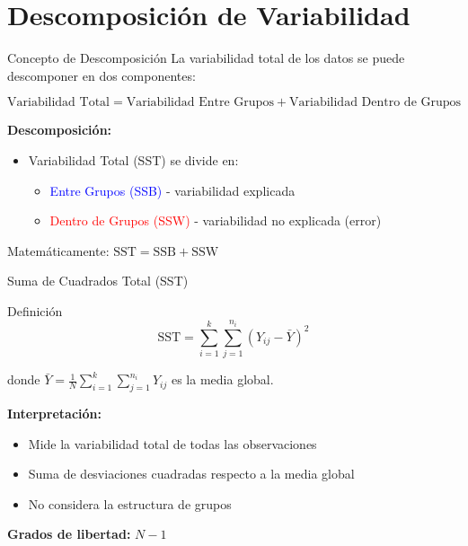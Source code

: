 \documentclass[10pt,aspectratio=169]{beamer}
\begin{document}
\section{Descomposición de Variabilidad}

\begin{frame}{Concepto de Descomposición}
La variabilidad total de los datos se puede descomponer en dos componentes:

\vspace{0.5cm}

\begin{equation*}
\text{Variabilidad Total} = \text{Variabilidad Entre Grupos} + \text{Variabilidad Dentro de Grupos}
\end{equation*}

\vspace{0.5cm}

\textbf{Descomposición:}
\begin{itemize}
    \item \alert{Variabilidad Total (SST)} se divide en:
    \begin{itemize}
        \item \textcolor{blue}{Entre Grupos (SSB)} - variabilidad explicada
        \item \textcolor{red}{Dentro de Grupos (SSW)} - variabilidad no explicada (error)
    \end{itemize}
\end{itemize}

\vspace{0.3cm}

Matemáticamente: \alert{$\text{SST} = \text{SSB} + \text{SSW}$}
\end{frame}

\begin{frame}{Suma de Cuadrados Total (SST)}
\begin{block}{Definición}
\begin{equation*}
\text{SST} = \sum_{i=1}^{k} \sum_{j=1}^{n_i} (Y_{ij} - \bar{Y})^2
\end{equation*}
\end{block}

donde $\bar{Y} = \frac{1}{N} \sum_{i=1}^{k} \sum_{j=1}^{n_i} Y_{ij}$ es la \alert{media global}.

\vspace{0.5cm}

\textbf{Interpretación:}
\begin{itemize}
    \item Mide la variabilidad total de todas las observaciones
    \item Suma de desviaciones cuadradas respecto a la media global
    \item No considera la estructura de grupos
\end{itemize}

\vspace{0.3cm}

\textbf{Grados de libertad:} $N - 1$
\end{frame}
\end{document}
